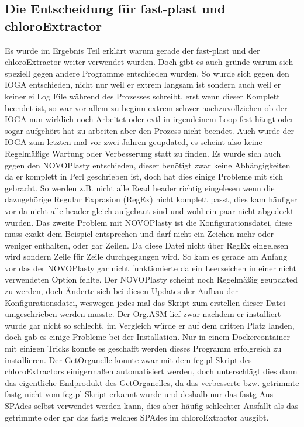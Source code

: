 \documentclass{scrartcl}
\begin{document}
\subsection{Die Entscheidung für fast-plast und chloroExtractor}
\label{sec-5-2}
Es wurde im Ergebnis Teil erklärt warum gerade der fast-plast und der chloroExtractor weiter verwendet wurden. Doch gibt es auch gründe warum sich speziell gegen andere Programme entschieden wurden. 
So wurde sich gegen den IOGA entschieden, nicht nur weil er extrem langsam ist sondern auch weil er keinerlei Log File während des Prozesses schreibt, erst wenn dieser Komplett beendet ist, so war vor allem zu beginn 
extrem schwer nachzuvollziehen ob der IOGA nun wirklich noch Arbeitet oder evtl in irgendeinem Loop fest hängt oder sogar aufgehört hat zu arbeiten aber den Prozess nicht beendet. Auch wurde der IOGA zum letzten mal 
vor zwei Jahren geupdated, es scheint also keine Regelmäßige Wartung oder Verbesserung statt zu finden. Es wurde sich auch gegen den NOVOPlasty entschieden, dieser benötigt zwar keine Abhängigkeiten da er komplett 
in Perl geschrieben ist, doch hat dies einige Probleme mit sich gebracht. So werden z.B. nicht alle Read header richtig eingelesen wenn die dazugehörige Regular Exprasion (RegEx) nicht komplett passt, dies kam häufiger 
vor da nicht alle header gleich aufgebaut sind und wohl ein paar nicht abgedeckt wurden. Das zweite Problem mit NOVOPlasty ist die Konfigurationsdatei, diese muss exakt dem Beispiel entsprechen und darf nicht ein Zeichen mehr
oder weniger enthalten, oder gar Zeilen. Da diese Datei nicht über RegEx eingelesen wird sondern Zeile für Zeile durchgegangen wird. So kam es gerade am Anfang vor das der NOVOPlasty gar nicht funktionierte da ein Leerzeichen 
in einer nicht verwendeten Option fehlte. Der NOVOPlasty scheint noch Regelmäßig geupdated zu werden, doch Änderte sich bei diesen Updates der Aufbau der Konfigurationsdatei, weswegen jedes mal das Skript zum erstellen dieser
Datei umgeschrieben werden musste. Der Org.ASM lief zwar nachdem er installiert wurde gar nicht so schlecht, im Vergleich würde er auf dem dritten Platz landen, doch gab es einige Probleme bei der Installation. Nur in einem
Dockercontainer mit einigen Tricks konnte es geschafft werden dieses Programm erfolgreich zu installieren. Der GetOrganelle konnte zwar mit dem fcg.pl Skript des chloroExtractors einigermaßen automatisiert werden, doch unterschlägt
dies dann das eigentliche Endprodukt des GetOrganelles, da das verbesserte bzw. getrimmte fastg nicht vom fcg.pl Skript erkannt wurde und deshalb nur das fastg Aus SPAdes selbst verwendet werden kann, dies aber häufig schlechter
Ausfällt als das getrimmte oder gar das fastg welches SPAdes im chloroExtractor ausgibt. 
\end{document}
